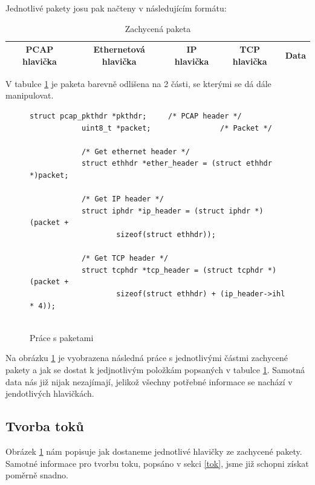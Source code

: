 \documentclass[11pt, a4paper, hidelinks]{article}[08.10.2023]
\begin{document}
    Jednotlivé pakety josu pak načteny v následujícím formátu:
    \vspace{1cm}

    \begin{table}[ht]
        \centering
         \begin{tabular}{|c|c|c|c|c|}
            \hline
                \color{red}PCAP hlavička  &  \color{blue}Ethernetová hlavička & \color{blue}IP hlavička & \color{blue}TCP hlavička & \color{blue}Data \\
            \hline
        \end{tabular}
        \caption{Zachycená paketa}
        \label{paketa}
    \end{table}

    \vspace{1cm}

    V tabulce \ref{paketa} je paketa barevně odlišena na 2 části, se kterými se dá dále manipulovat.
    \pagebreak

     \begin{figure}[h]
        \centering
        \begin{lstlisting}[style=CStyle]
            struct pcap_pkthdr *pkthdr;     /* PCAP header */
            uint8_t *packet;                /* Packet */

            /* Get ethernet header */
            struct ethhdr *ether_header = (struct ethhdr *)packet;

            /* Get IP header */
            struct iphdr *ip_header = (struct iphdr *)(packet + 
                    sizeof(struct ethhdr));

            /* Get TCP header */
            struct tcphdr *tcp_header = (struct tcphdr *)(packet + 
                    sizeof(struct ethhdr) + (ip_header->ihl * 4));
            
        \end{lstlisting}
        \caption{Práce s paketami}
        \label{paketa_c}
    \end{figure}

    Na obrázku \ref{paketa_c} je vyobrazena následná práce s jednotlivými částmi zachycené pakety a jak se dostat k jedjnotlivým položkám popsaných v tabulce \ref{paketa}. Samotná data nás již nijak nezajímají, jelikož všechny potřebné informace se nachází v jendotlivých hlavičkách\cite{Pcap_general}.

    \subsection{Tvorba toků}
    Obrázek \ref{paketa_c} nám popisuje jak dostaneme jednotlivé hlavičky ze zachycené pakety. Samotné informace pro tvorbu toku, popsáno v sekci \ref{tok}, jsme již schopni získat poměrně snadno.
\end{document}
